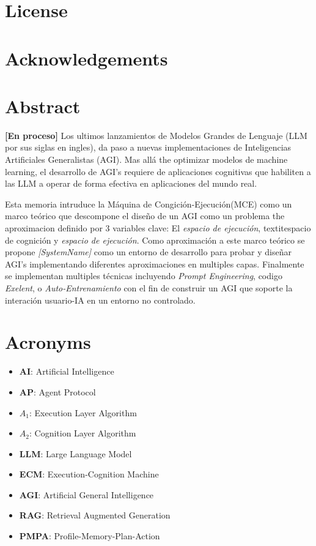 
\chapter*{License}
\vspace{4cm}
\lipsum[1]

\chapter*{Acknowledgements}
\lipsum[2]



\chapter*{Abstract}
\textbf{[En proceso]} Los ultimos lanzamientos de Modelos Grandes de Lenguaje
(LLM por sus siglas en ingles), da paso a nuevas implementaciones de Inteligencias
Artificiales Generalistas (AGI). Mas allá the optimizar modelos de machine learning,
el desarrollo de AGI's requiere de aplicaciones cognitivas que habiliten a las LLM
a operar de forma efectiva en aplicaciones del mundo real.

Esta memoria intruduce la Máquina de Congición-Ejecución(MCE) como un marco teórico
que descompone el diseño de un AGI como un problema the aproximacion definido por 3
variables clave: El \textit{espacio de ejecución}, textit{espacio de cognición} y 
\textit{espacio de ejecución}. Como aproximación a este marco teórico se propone
\textit{[SystemName]} como un entorno de desarrollo para probar y diseñar AGI's
implementando diferentes aproximaciones en multiples capas. Finalmente se implementan
multiples técnicas incluyendo \textit{Prompt Engineering}, codigo \textit{Exelent},
o \textit{Auto-Entrenamiento} con el fin de construir un AGI que soporte la interación
usuario-IA en un entorno no controlado.



\chapter*{Acronyms}
\begin{itemize}
    \item \textbf{AI}: Artificial Intelligence
    \item \textbf{AP}: Agent Protocol
    \item \textbf{$A_1$}: Execution Layer Algorithm
    \item \textbf{$A_2$}: Cognition Layer Algorithm
    \item \textbf{LLM}: Large Language Model
    \item \textbf{ECM}: Execution-Cognition Machine
    \item \textbf{AGI}: Artificial General Intelligence
    \item \textbf{RAG}: Retrieval Augmented Generation 
    \item \textbf{PMPA}: Profile-Memory-Plan-Action

\end{itemize}

\begingroup
\setlength{\parskip}{0pt}
\setlength{\parindent}{3pt}
\tableofcontents
\endgroup

